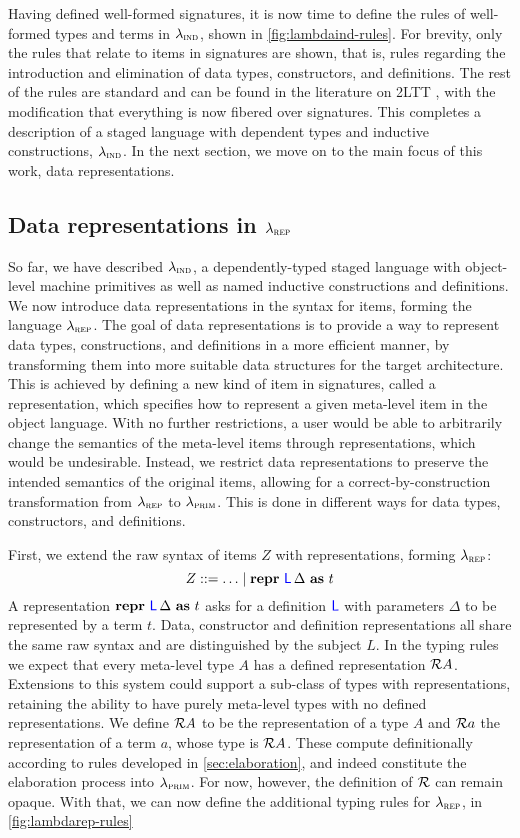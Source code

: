 Having defined well-formed signatures, it is now time to define the rules of
well-formed types and terms in $\lambda_{\textsc{ind}}$, shown in
\cref{fig:lambdaind-rules}. For brevity, only the rules that relate to items in
signatures are shown, that is, rules regarding the introduction and elimination
of data types, constructors, and definitions. The rest of the rules are
standard and can be found in the literature on 2LTT \cite{Kovacs2022-vb}, with
the modification that everything is now fibered over signatures. This completes
a description of a staged language with dependent types and inductive
constructions, $\lambda_{\textsc{ind}}$. In the next section, we move on to the main focus
of this work, data representations.

\subsection{Data representations in $\lambda_{\textsc{rep}}$}\label{sub:lambdarep}

So far, we have described $\lambda_{\textsc{ind}}$, a dependently-typed staged language
with object-level machine primitives as well as named inductive constructions
and definitions. We now introduce data representations in the syntax for items,
forming the language $\lambda_{\textsc{rep}}$. The goal of data representations is to
provide a way to represent data types, constructions, and definitions in a more
efficient manner, by transforming them into more suitable data structures for
the target architecture. This is achieved by defining a new kind of item in
signatures, called a representation, which specifies how to represent a given
meta-level item in the object language. With no further restrictions, a user
would be able to arbitrarily change the semantics of the meta-level items
through representations, which would be undesirable. Instead, we restrict data
representations to preserve the intended semantics of the original items,
allowing for a correct-by-construction transformation from $\lambda_{\textsc{rep}}$ to
$\lambda_{\textsc{prim}}$. This is done in different ways for data types, constructors, and
definitions.

First, we extend the raw syntax of items $Z$ with representations, forming
$\lambda_{\textsc{rep}}$:
\[
  Z ::= \ldots \mid \textbf{repr} \ {\color{blue}{\mathsf{L}}}\, {\Delta}\ \textbf{as}\ {t}
\]
A representation $\textbf{repr} \ {\color{blue}{\mathsf{L}}}\, {\Delta}\ \textbf{as}\ {t}$ asks for a definition ${\color{blue}{\mathsf{L}}}$ with
parameters $\Delta$ to be represented by a term $t$. Data, constructor and
definition representations all share the same raw syntax and are distinguished
by the subject $L$. In the typing rules we expect that every meta-level type
$A$ has a defined representation $\mathcal{R} {A}$. Extensions to this system could
support a sub-class of types with representations, retaining the ability to
have purely meta-level types with no defined representations. We define
$\mathcal{R} {A}$ to be the representation of a type $A$ and $\mathcal{R} {a}$ the
representation of a term $a$, whose type is $\mathcal{R} {A}$. These compute
definitionally according to rules developed in \cref{sec:elaboration}, and
indeed constitute the elaboration process into $\lambda_{\textsc{prim}}$. For now, however,
the definition of $\mathcal{R} {}$ can remain opaque. With that, we can now define
the additional typing rules for $\lambda_{\textsc{rep}}$, in \cref{fig:lambdarep-rules}

